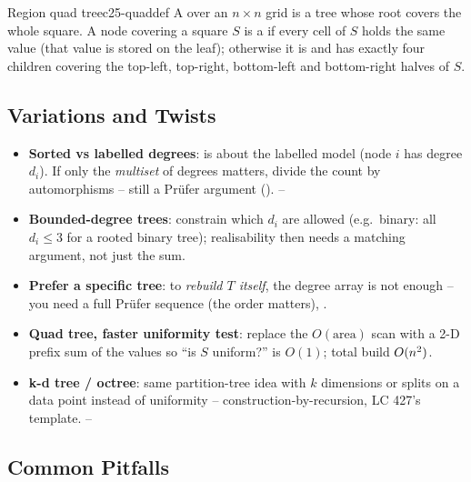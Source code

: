 \begin{definition}{Region quad tree}{c25-quaddef}
A  over an $n\times n$ grid is a tree whose root covers the whole square. A node
covering a square $S$ is a  if every cell of $S$ holds the same value (that value is
stored on the leaf); otherwise it is  and has exactly four children covering the
top-left, top-right, bottom-left and bottom-right halves of $S$.
\end{definition}

\subsection{Variations and Twists}

\begin{itemize}[nosep]
  \item \textbf{Sorted vs labelled degrees}:  is about the labelled model (node
        $i$ has degree $d_i$). If only the \emph{multiset} of degrees matters, divide the count by
        automorphisms -- still a Pr\"ufer argument (). \hfill{}--
  \item \textbf{Bounded-degree trees}: constrain which $d_i$ are allowed (e.g.\ binary: all $d_i\le3$
        for a rooted binary tree); realisability then needs a matching argument, not just the sum. \hfill{}
  \item \textbf{Prefer a specific tree}: to \emph{rebuild $T$ itself}, the degree array is not enough --
        you need a full Pr\"ufer sequence (the order matters), . \hfill{}
  \item \textbf{Quad tree, faster uniformity test}: replace the $O(\text{area})$ scan with a 2-D prefix
        sum of the values so ``is $S$ uniform?'' is $O(1)$; total build $O(n^{2})$. \hfill{}
  \item \textbf{k-d tree / octree}: same partition-tree idea with $k$ dimensions or splits on
        a data point instead of uniformity -- construction-by-recursion, LC 427's template. \hfill{}--
\end{itemize}

\subsection{Common Pitfalls}\label{sec:c25-degree-pitfalls}

